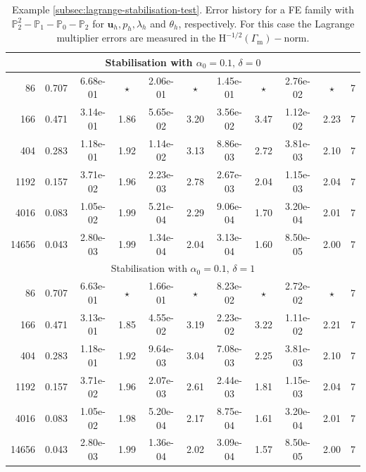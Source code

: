 \documentclass[onefignum,onetabnum,reqno,a4paper,final]{siamart250211}
\newcommand\bu{\boldsymbol{u}}
\newcommand\0{\mathbf{0}}
\renewcommand\H{\mathrm{H}}
\newcommand\Gm{\Gamma_{\mathrm{m}}}
\numberwithin{figure}{section}
\numberwithin{table}{section}
\begin{document}
{\begin{table}[t!]
{\begin{tabular}{|rcccccccccc|}
            \hline 
            \multicolumn{11}{|c|}{Stabilisation with $\alpha_0=0.1,\,\delta=0$} \\
            \hline
            86 & 0.707 & 6.68e-01 & $\star$ & 2.06e-01 & $\star$ & 1.45e-01 & $\star$ & 2.76e-02 & $\star$ &  7 \\
   166 & 0.471 & 3.14e-01 & 1.86 & 5.65e-02 & 3.20 & 3.56e-02 & 3.47 & 1.12e-02 & 2.23 &  7 \\
   404 & 0.283 & 1.18e-01 & 1.92 & 1.14e-02 & 3.13 & 8.86e-03 & 2.72 & 3.81e-03 & 2.10 &  7 \\
  1192 & 0.157 & 3.71e-02 & 1.96 & 2.23e-03 & 2.78 & 2.67e-03 & 2.04 & 1.15e-03 & 2.04 &  7 \\
  4016 & 0.083 & 1.05e-02 & 1.99 & 5.21e-04 & 2.29 & 9.06e-04 & 1.70 & 3.20e-04 & 2.01 &  7 \\
 14656 & 0.043 & 2.80e-03 & 1.99 & 1.34e-04 & 2.04 & 3.13e-04 & 1.60 & 8.50e-05 & 2.00 &  7 \\
            \hline 
            \multicolumn{11}{|c|}{Stabilisation with $\alpha_0=0.1,\,\delta=1$ } \\
            \hline
            86 & 0.707 & 6.63e-01 & $\star$ & 1.66e-01 & $\star$ & 8.23e-02 & $\star$ & 2.72e-02 & $\star$ &  7 \\
   166 & 0.471 & 3.13e-01 & 1.85 & 4.55e-02 & 3.19 & 2.23e-02 & 3.22 & 1.11e-02 & 2.21 &  7 \\
   404 & 0.283 & 1.18e-01 & 1.92 & 9.64e-03 & 3.04 & 7.08e-03 & 2.25 & 3.81e-03 & 2.10 &  7 \\
  1192 & 0.157 & 3.71e-02 & 1.96 & 2.07e-03 & 2.61 & 2.44e-03 & 1.81 & 1.15e-03 & 2.04 &  7 \\
  4016 & 0.083 & 1.05e-02 & 1.98 & 5.20e-04 & 2.17 & 8.75e-04 & 1.61 & 3.20e-04 & 2.01 &  7 \\
 14656 & 0.043 & 2.80e-03 & 1.99 & 1.36e-04 & 2.02 & 3.09e-04 & 1.57 & 8.50e-05 & 2.00 &  7 \\
            \hline
            \hline
    \end{tabular}}
    \smallskip
    \caption{Example 
    \ref{subsec:lagrange-stabilisation-test}.
    Error history for a FE family with $\mathbb{P}^2_2-\mathbb{P}_1 - \mathbb{P}_0 - \mathbb{P}_2$ 
        for $\bu_h, p_h,\lambda_h$ and $\theta_h$, respectively. For this case the Lagrange multiplier errors are measured in the $\H^{-1/2}(\Gm)-$norm. 
    }
    \label{tables-5to8}
\end{table}

}
\end{document}
